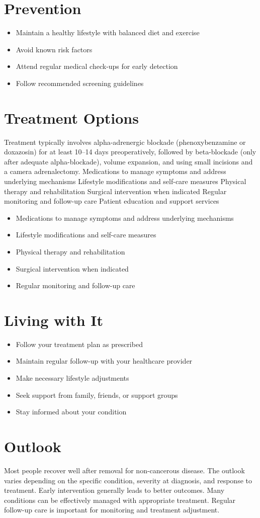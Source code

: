 \section{Prevention}
\begin{itemize}[noitemsep]
  \item Maintain a healthy lifestyle with balanced diet and exercise
  \item Avoid known risk factors
  \item Attend regular medical check-ups for early detection
  \item Follow recommended screening guidelines
\end{itemize}
\section{Treatment Options}
Treatment typically involves alpha-adrenergic blockade (phenoxybenzamine or doxazosin) for at least 10--14 days preoperatively, followed by beta-blockade (only after adequate alpha-blockade), volume expansion, and using small incisions and a camera adrenalectomy. Medications to manage symptoms and address underlying mechanisms Lifestyle modifications and self-care measures Physical therapy and rehabilitation Surgical intervention when indicated Regular monitoring and follow-up care Patient education and support services

\begin{itemize}[noitemsep]
  \item Medications to manage symptoms and address underlying mechanisms
  \item Lifestyle modifications and self-care measures
  \item Physical therapy and rehabilitation
  \item Surgical intervention when indicated
  \item Regular monitoring and follow-up care
\end{itemize}
\section{Living with It}
\begin{itemize}[noitemsep]
  \item Follow your treatment plan as prescribed
  \item Maintain regular follow-up with your healthcare provider
  \item Make necessary lifestyle adjustments
  \item Seek support from family, friends, or support groups
  \item Stay informed about your condition
\end{itemize}
\section{Outlook}
Most people recover well after removal for non-cancerous disease. The outlook varies depending on the specific condition, severity at diagnosis, and response to treatment. Early intervention generally leads to better outcomes. Many conditions can be effectively managed with appropriate treatment. Regular follow-up care is important for monitoring and treatment adjustment.
